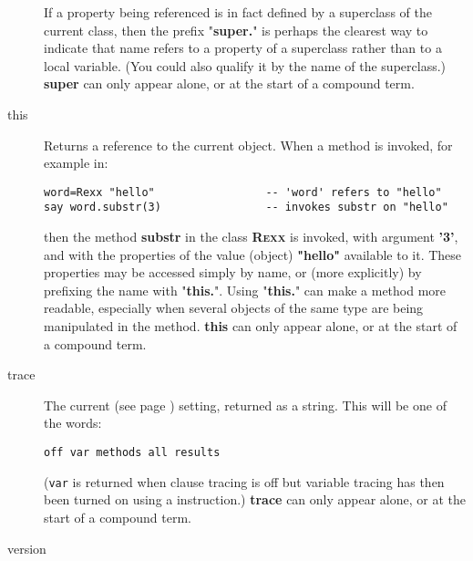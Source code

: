 \begin{description}
If a property being referenced is in fact defined by a superclass of
the current class, then the prefix "\textbf{super.}" is perhaps
the clearest way to indicate that name refers to a property of a
superclass rather than to a local variable.
(You could also qualify it by the name of the superclass.)
 \textbf{super} can only appear alone, or at the start of a
compound term.
\item[this]\label{refswthis}
 
Returns a reference to the current object.
When a method is invoked, for example in:
\begin{lstlisting}
word=Rexx "hello"                 -- 'word' refers to "hello"
say word.substr(3)                -- invokes substr on "hello"
\end{lstlisting}
then the method \textbf{substr} in the class \textbf{R\textsc{exx}} is
invoked, with argument \textbf{'3'}, and with the properties of the
value (object) \textbf{"hello"} available to it.
These properties may be accessed simply by name, or (more explicitly) by
prefixing the name with "\textbf{this.}".
Using "\textbf{this.}" can make a method more readable,
especially when several objects of the same type are being manipulated
in the method.
 \textbf{this} can only appear alone, or at the start of a
compound term.
\item[trace]\label{refswtrace}

The current   (see page \pageref{reftrace})  setting,
returned as a \nr{} string.
This will be one of the words:
\begin{lstlisting}
off var methods all results
\end{lstlisting}

(\texttt{var} is returned when clause tracing is off but variable
tracing has then been turned on using a  instruction.)
 \textbf{trace} can only appear alone, or at the start of a
compound term.
\item[version]\label{refswvers}
 

\end{description}
